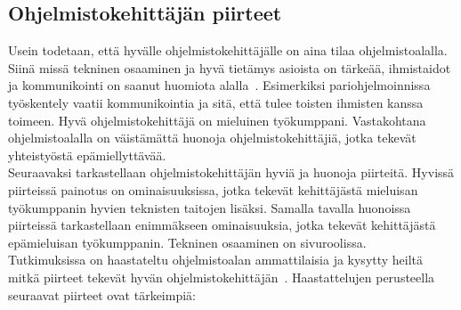 \documentclass[finnish]{../tktltiki2}
\theoremstyle{definition}
\theoremstyle{remark}
\begin{document}
\subsection{Ohjelmistokehittäjän piirteet}

Usein todetaan, että hyvälle ohjelmistokehittäjälle on aina tilaa ohjelmistoalalla.
Siinä missä tekninen osaaminen ja hyvä tietämys asioista on
tärkeää, ihmistaidot ja kommunikointi on saanut
huomiota alalla~\cite{Hall:2007:CNT:1235000.1235043}. Esimerkiksi
pariohjelmoinnissa työskentely vaatii kommunikointia ja sitä, että
tulee toisten ihmisten kanssa toimeen. Hyvä ohjelmistokehittäjä
on mieluinen työkumppani. Vastakohtana ohjelmistoalalla
on väistämättä huonoja ohjelmistokehittäjiä, jotka tekevät
yhteistyöstä epämiellyttävää.\\

Seuraavaksi tarkastellaan ohjelmistokehittäjän hyviä ja huonoja
piirteitä. Hyvissä piirteissä painotus on ominaisuuksissa, jotka
tekevät kehittäjästä mieluisan työkumppanin hyvien teknisten
taitojen lisäksi. Samalla tavalla huonoissa piirteissä tarkastellaan
enimmäkseen ominaisuuksia, jotka tekevät kehittäjästä epämieluisan työkumppanin. Tekninen osaaminen on sivuroolissa.\\

Tutkimuksissa
on haastateltu ohjelmistoalan ammattilaisia ja kysytty heiltä mitkä
piirteet tekevät hyvän ohjelmistokehittäjän~\cite{Begel:2008:PPW:1414004.1414026,Hall:2007:CNT:1235000.1235043}. Haastattelujen perusteella seuraavat piirteet ovat tärkeimpiä:
\end{document}
